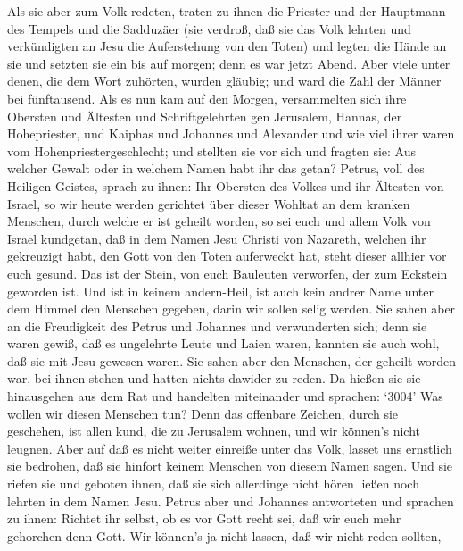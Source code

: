  Als sie aber zum Volk redeten, traten zu ihnen die Priester
und der Hauptmann des Tempels und die Sadduzäer  (sie
verdroß, daß sie das Volk lehrten und verkündigten an Jesu die
Auferstehung von den Toten)  und legten die Hände an sie und
setzten sie ein bis auf morgen; denn es war jetzt Abend. 
Aber viele unter denen, die dem Wort zuhörten, wurden gläubig; und ward
die Zahl der Männer bei fünftausend.  Als es nun kam auf den
Morgen, versammelten sich ihre Obersten und Ältesten und
Schriftgelehrten gen Jerusalem,  Hannas, der Hohepriester,
und Kaiphas und Johannes und Alexander und wie viel ihrer waren vom
Hohenpriestergeschlecht;  und stellten sie vor sich und
fragten sie: Aus welcher Gewalt oder in welchem Namen habt ihr das
getan?  Petrus, voll des Heiligen Geistes, sprach zu ihnen:
Ihr Obersten des Volkes und ihr Ältesten von Israel,  so wir
heute werden gerichtet über dieser Wohltat an dem kranken Menschen,
durch welche er ist geheilt worden,  so sei euch und allem
Volk von Israel kundgetan, daß in dem Namen Jesu Christi von Nazareth,
welchen ihr gekreuzigt habt, den Gott von den Toten auferweckt hat,
steht dieser allhier vor euch gesund.  Das ist der Stein,
von euch Bauleuten verworfen, der zum Eckstein geworden ist.
 Und ist in keinem andern-Heil, ist auch kein andrer Name
unter dem Himmel den Menschen gegeben, darin wir sollen selig werden.
 Sie sahen aber an die Freudigkeit des Petrus und Johannes
und verwunderten sich; denn sie waren gewiß, daß es ungelehrte Leute und
Laien waren, kannten sie auch wohl, daß sie mit Jesu gewesen waren.
 Sie sahen aber den Menschen, der geheilt worden war, bei
ihnen stehen und hatten nichts dawider zu reden.  Da hießen
sie sie hinausgehen aus dem Rat und handelten miteinander und sprachen:
 `3004' Was wollen wir diesen Menschen tun? Denn das
offenbare Zeichen, durch sie geschehen, ist allen kund, die zu Jerusalem
wohnen, und wir können's nicht leugnen.  Aber auf daß es
nicht weiter einreiße unter das Volk, lasset uns ernstlich sie bedrohen,
daß sie hinfort keinem Menschen von diesem Namen sagen. 
Und sie riefen sie und geboten ihnen, daß sie sich allerdinge nicht
hören ließen noch lehrten in dem Namen Jesu.  Petrus aber
und Johannes antworteten und sprachen zu ihnen: Richtet ihr selbst, ob
es vor Gott recht sei, daß wir euch mehr gehorchen denn Gott.
 Wir können's ja nicht lassen, daß wir nicht reden sollten,
